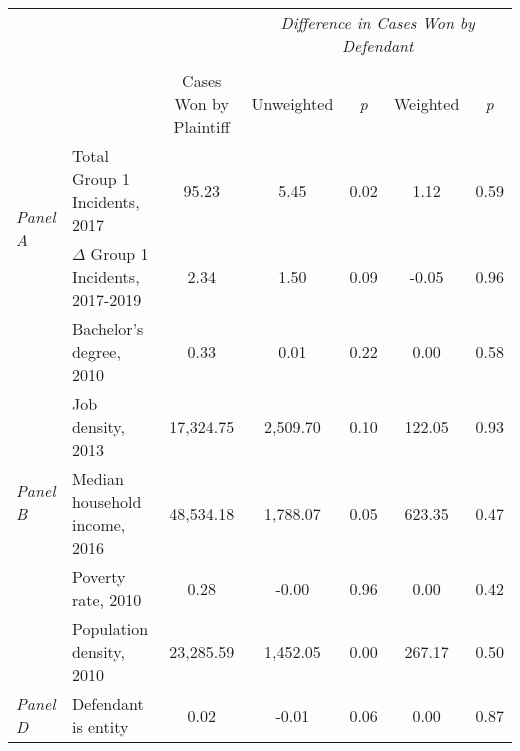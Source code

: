 \begin{tabular}{llccccc}
\toprule
 &  & \textit{} & \multicolumn{4}{c}{\textit{Difference in Cases Won by Defendant}} \\
\cline{4-7}
\\
 &  & Cases Won by Plaintiff & Unweighted & \emph{p} & Weighted & \emph{p} \\
\midrule
\multirow[c]{2}{3cm}{\textit{Panel A}} & Total Group 1 Incidents, 2017 & 95.23 & 5.45 & 0.02 & 1.12 & 0.59 \\
 & $\Delta$ Group 1 Incidents, 2017-2019 & 2.34 & 1.50 & 0.09 & -0.05 & 0.96 \\
\cline{1-7}
\multirow[c]{5}{3cm}{\textit{Panel B}} & Bachelor's degree, 2010 & 0.33 & 0.01 & 0.22 & 0.00 & 0.58 \\
 & Job density, 2013 & 17,324.75 & 2,509.70 & 0.10 & 122.05 & 0.93 \\
 & Median household income, 2016 & 48,534.18 & 1,788.07 & 0.05 & 623.35 & 0.47 \\
 & Poverty rate, 2010 & 0.28 & -0.00 & 0.96 & 0.00 & 0.42 \\
 & Population density, 2010 & 23,285.59 & 1,452.05 & 0.00 & 267.17 & 0.50 \\
\cline{1-7}
\textit{Panel D} & Defendant is entity & 0.02 & -0.01 & 0.06 & 0.00 & 0.87 \\
\cline{1-7}
\bottomrule
\end{tabular}
